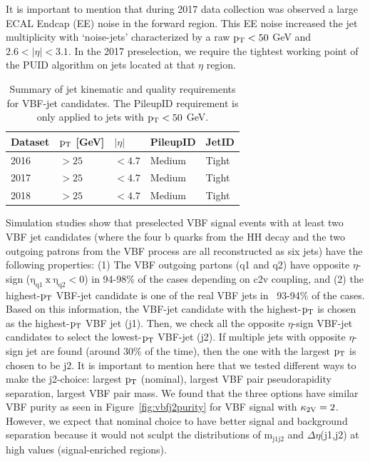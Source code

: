 It is important to mention that during 2017 data collection was observed a large ECAL Endcap (EE) noise in the forward region. This EE noise increased the jet multiplicity with `noise-jets' characterized by a raw $\mathrm{p_{T}}<50$ GeV and $2.6<|\eta|<3.1$. In the 2017 preselection, we require the tightest working point of the PUID algorithm on jets located at that $\eta$ region.

\begin{table}[htb]
\caption[Summary of jet kinematic and quality requirements for VBF-jet candidates]{\label{event_selection:tab:qjetreq} Summary of jet kinematic and quality requirements for VBF-jet candidates. The PileupID requirement is only applied to jets with $\mathrm{p_{T}}<50$ GeV.}
\centering
\begin{tabularx}{\textwidth}{XXXXX}
	\hline
	Dataset & $\mathrm{p_{T}}$ [GeV] &$|\eta|$  & PileupID & JetID\\ 
	\hline
	2016    & $>25$        & $<4.7$  & Medium   & Tight\\ 
	2017    & $>25$        & $<4.7$  & Medium   & Tight\\ 
	2018    & $>25$        & $<4.7$  & Medium   & Tight\\
	\hline
\end{tabularx}
\end{table}

Simulation studies show that preselected VBF signal events with at least two VBF jet candidates (where the four b quarks from the HH decay and the two outgoing patrons from the VBF process are all reconstructed as six jets) have the following properties: (1) The VBF outgoing partons (q1 and q2) have opposite $\eta$-sign  ($\mathrm{\eta_{q1}~x~\eta_{q2}<0}$) in 94-98\% of the cases depending on c2v coupling, and (2) the highest-$\mathrm{p_{T}}$ VBF-jet candidate is one of the real VBF jets in ~93-94\% of the cases. Based on this information, the VBF-jet candidate with the highest-$\mathrm{p_{T}}$ is chosen as the highest-$\mathrm{p_{T}}$ VBF jet (j1). Then, we check all the opposite $\eta$-sign VBF-jet candidates to select the lowest-$\mathrm{p_{T}}$ VBF-jet (j2). If multiple jets with opposite $\eta$-sign jet are found (around 30\% of the time), then the one with the largest $\mathrm{p_{T}}$ is chosen to be j2. It is important to mention here that we tested different ways to make the j2-choice: largest $\mathrm{p_{T}}$ (nominal), largest VBF pair pseudorapidity separation, largest VBF pair mass. We found that the three options have similar VBF purity as seen in Figure~\ref{fig:vbfj2purity} for VBF signal with $\mathrm{\kappa_{2V} }=2$. However, we expect that nominal choice to have better signal and background separation because it would not sculpt the distributions of $\mathrm{m_{j1j2}}$ and $\Delta\eta$(j1,j2) at high values (signal-enriched regions). 

